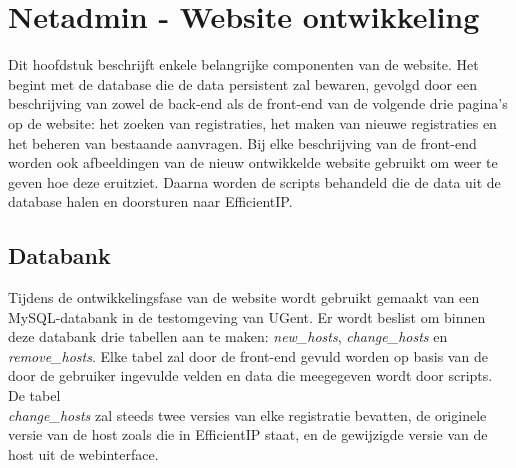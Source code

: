 
\chapter{Netadmin - Website ontwikkeling}%
\label{ch:netadmin-website-ontwikkeling}
Dit hoofdstuk beschrijft enkele belangrijke componenten van de website. Het begint met de database die de data persistent zal bewaren, gevolgd door een beschrijving van zowel de back-end als de front-end van de volgende drie pagina's op de website: het zoeken van registraties, het maken van nieuwe registraties en het beheren van bestaande aanvragen. Bij elke beschrijving van de front-end worden ook afbeeldingen van de nieuw ontwikkelde website gebruikt om weer te geven hoe deze eruitziet. Daarna worden de scripts behandeld die de data uit de database halen en doorsturen naar EfficientIP.

\section{Databank}
\label{databank}
Tijdens de ontwikkelingsfase van de website wordt gebruikt gemaakt van een \\MySQL-databank in de testomgeving van UGent. Er wordt beslist om binnen deze databank drie tabellen aan te maken: \textit{new\_hosts}, \textit{change\_hosts} en \textit{remove\_hosts}. Elke tabel zal door de front-end gevuld worden op basis van de door de gebruiker ingevulde velden en data die meegegeven wordt door scripts.
De tabel \\\textit{change\_hosts} zal steeds twee versies van elke registratie bevatten, de originele versie van de host zoals die in EfficientIP staat, en de gewijzigde versie van de host uit de webinterface.

